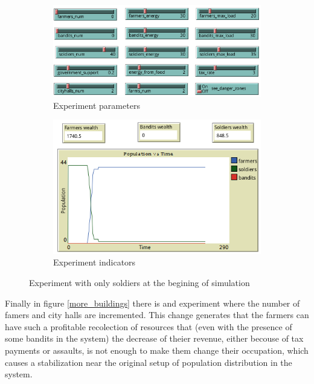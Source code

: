 \documentclass{wscpaperproc}
\begin{document}
\begin{figure}[h!]
    \begin{subfigure}{0.45\textwidth}
    \includegraphics[width=\textwidth]{Images/Exp4_sliders.png}
    \caption{Experiment parameters}
    \end{subfigure}
    \hfill
    \begin{subfigure}{0.45\textwidth}
    \includegraphics[width=\textwidth]{Images/Exp4_indicators.png}
    \caption{Experiment indicators}
    \end{subfigure}%
    \caption{Experiment with only soldiers at the begining of simulation}
    \label{soldiers_only}
\end{figure}

Finally in figure \ref{more_buildings} there is and experiment where the number
of famers and city halls are incremented. This change generates that the farmers
can have such a profitable recolection of resources that (even with the presence
of some bandits in the system) the decrease of theier revenue, either becouse of
tax payments or assaults, is not enough to make them change their occupation,
which causes a stabilization near the original setup of population distribution
in the system.
\end{document}
